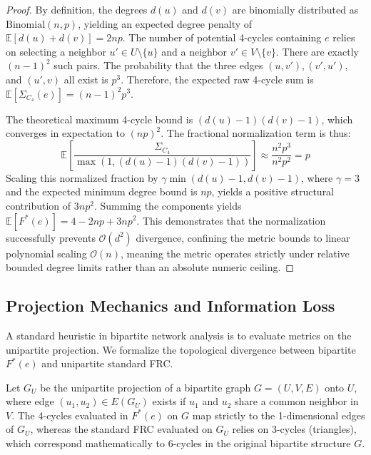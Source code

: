 \documentclass{siuro250211}
\begin{document}
\begin{proof}
By definition, the degrees $d(u)$ and $d(v)$ are binomially distributed as $\text{Binomial}(n, p)$, yielding an expected degree penalty of $\mathbb{E}[d(u) + d(v)] = 2np$. The number of potential 4-cycles containing $e$ relies on selecting a neighbor $u' \in U \setminus \{u\}$ and a neighbor $v' \in V \setminus \{v\}$. There are exactly $(n-1)^2$ such pairs. The probability that the three edges $(u, v'), (v', u'),$ and $(u', v)$ all exist is $p^3$. Therefore, the expected raw 4-cycle sum is $\mathbb{E}[\Sigma_{C_4}(e)] = (n-1)^2 p^3$.

The theoretical maximum 4-cycle bound is $(d(u)-1)(d(v)-1)$, which converges in expectation to $(np)^2$. The fractional normalization term is thus:
\begin{equation}
\mathbb{E}\left[ \frac{\Sigma_{C_4}}{\max(1, (d(u)-1)(d(v)-1))} \right] \approx \frac{n^2 p^3}{n^2 p^2} = p
\end{equation}
Scaling this normalized fraction by $\gamma \min(d(u)-1, d(v)-1)$, where $\gamma = 3$ and the expected minimum degree bound is $np$, yields a positive structural contribution of $3np^2$. Summing the components yields $\mathbb{E}[F^*(e)] = 4 - 2np + 3np^2$. This demonstrates that the normalization successfully prevents $\mathcal{O}(d^2)$ divergence, confining the metric bounds to linear polynomial scaling $\mathcal{O}(n)$, meaning the metric operates strictly under relative bounded degree limits rather than an absolute numeric ceiling.
\end{proof}

\subsection{Projection Mechanics and Information Loss}
A standard heuristic in bipartite network analysis is to evaluate metrics on the unipartite projection. We formalize the topological divergence between bipartite $F^*(e)$ and unipartite standard FRC.

\begin{theorem}
Let $G_U$ be the unipartite projection of a bipartite graph $G=(U, V, E)$ onto $U$, where edge $(u_1, u_2) \in E(G_U)$ exists if $u_1$ and $u_2$ share a common neighbor in $V$. The 4-cycles evaluated in $F^*(e)$ on $G$ map strictly to the 1-dimensional edges of $G_U$, whereas the standard FRC evaluated on $G_U$ relies on 3-cycles (triangles), which correspond mathematically to 6-cycles in the original bipartite structure $G$.
\end{theorem}
\end{document}
